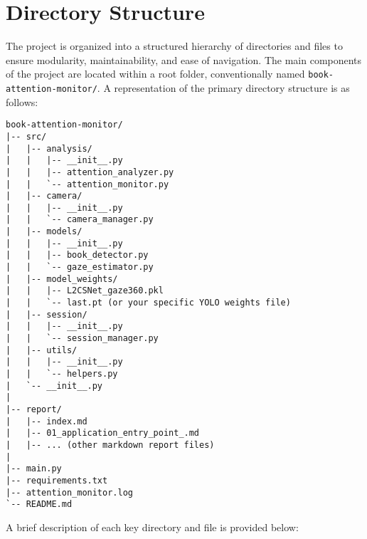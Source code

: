 \section{Directory Structure}
The project is organized into a structured hierarchy of directories and files to ensure modularity, maintainability, and ease of navigation. The main components of the project are located within a root folder, conventionally named \texttt{book-attention-monitor/}. A representation of the primary directory structure is as follows:

\begin{verbatim}
book-attention-monitor/
|-- src/
|   |-- analysis/
|   |   |-- __init__.py
|   |   |-- attention_analyzer.py
|   |   `-- attention_monitor.py
|   |-- camera/
|   |   |-- __init__.py
|   |   `-- camera_manager.py
|   |-- models/
|   |   |-- __init__.py
|   |   |-- book_detector.py
|   |   `-- gaze_estimator.py
|   |-- model_weights/
|   |   |-- L2CSNet_gaze360.pkl
|   |   `-- last.pt (or your specific YOLO weights file)
|   |-- session/
|   |   |-- __init__.py
|   |   `-- session_manager.py
|   |-- utils/
|   |   |-- __init__.py
|   |   `-- helpers.py
|   `-- __init__.py
|
|-- report/
|   |-- index.md
|   |-- 01_application_entry_point_.md
|   |-- ... (other markdown report files)
|
|-- main.py
|-- requirements.txt
|-- attention_monitor.log
`-- README.md
\end{verbatim}

A brief description of each key directory and file is provided below:

